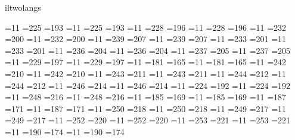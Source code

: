 %


\csname iltwolangs\endcsname

=11 =225 =193 %
=11 =225 =193 %
=11 =228 =196 %
=11 =228 =196 %
=11 =232 =200 %
=11 =232 =200 %
=11 =239 =207 %
=11 =239 =207 %
=11 =233 =201 %
=11 =233 =201 %
=11 =236 =204 %
=11 =236 =204 %
=11 =237 =205 %
=11 =237 =205 %
=11 =229 =197 %
=11 =229 =197 %
=11 =181 =165 %
=11 =181 =165 %
=11 =242 =210 %
=11 =242 =210 %
=11 =243 =211 %
=11 =243 =211 %
=11 =244 =212 %
=11 =244 =212 %
=11 =246 =214 %
=11 =246 =214 %
=11 =224 =192 %
=11 =224 =192 %
=11 =248 =216 %
=11 =248 =216 %
=11 =185 =169 %
=11 =185 =169 %
=11 =187 =171 %
=11 =187 =171 %
=11 =250 =218 %
=11 =250 =218 %
=11 =249 =217 %
=11 =249 =217 %
=11 =252 =220 %
=11 =252 =220 %
=11 =253 =221 %
=11 =253 =221 %
=11 =190 =174 %
=11 =190 =174 %

